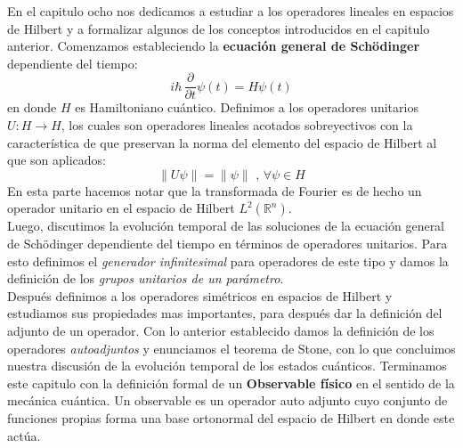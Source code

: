 \documentclass[12pt]{book}
\numberwithin{equation}{chapter}
\def\R{\mathbb{R}}
\def\rar{\rightarrow}
\begin{document}
En el capitulo ocho nos dedicamos a estudiar a los operadores lineales en espacios de Hilbert y a formalizar algunos de los conceptos introducidos en el capitulo anterior. Comenzamos estableciendo la {\bf ecuaci\'on general de Sch\"odinger} dependiente del tiempo:
$$ i \hbar \, \frac{\partial}{\partial t} \psi(t) = H\psi(t) $$
en donde $H$ es Hamiltoniano cu\'antico. Definimos a los operadores unitarios $U:H \rar H$, los cuales son operadores lineales acotados sobreyectivos con la caracter\'istica de que preservan la norma del elemento del espacio de Hilbert al que son aplicados:
$$ \| U \psi \|=\| \psi \|  \,\,,\, \forall \psi \in H $$
En esta parte hacemos notar que la transformada de Fourier es de hecho un operador unitario en el espacio de Hilbert $L^{2}(\R^{n})$.\\
Luego, discutimos la evoluci\'on temporal de las soluciones de la ecuaci\'on general de Sch\"odinger dependiente del tiempo en t\'erminos de operadores unitarios. Para esto definimos el \emph{generador infinitesimal} para operadores de este tipo y damos la definici\'on de los \emph{grupos unitarios de un par\'ametro}. \\
Despu\'es definimos a los operadores sim\'etricos en espacios de Hilbert y estudiamos sus propiedades mas importantes, para despu\'es dar la definici\'on del adjunto de un operador. Con lo anterior establecido damos la definici\'on de los operadores \emph{autoadjuntos} y enunciamos el teorema de Stone, con lo que concluimos nuestra discusi\'on de la evoluci\'on temporal de los estados cu\'anticos. Terminamos este capitulo con la definici\'on formal de un {\bf Observable f\'isico} en el sentido de la mec\'anica cu\'antica. Un observable es un operador auto adjunto cuyo conjunto de funciones propias forma una base ortonormal del espacio de Hilbert en donde este act\'ua.\\
\end{document}
